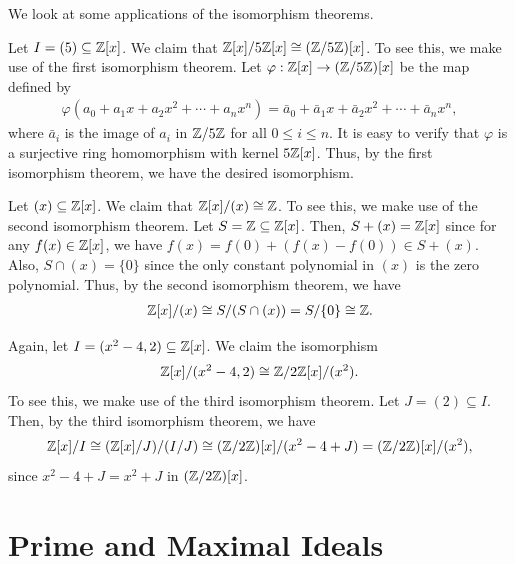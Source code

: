 We look at some applications of the isomorphism theorems.

\begin{example}
    Let $I = (5) \subseteq \mathbb{Z}[x]$. We claim that $\mathbb{Z}[x]/5\mathbb{Z}[x] \cong (\mathbb{Z}/5\mathbb{Z})[x]$. To see this, we make use of the first isomorphism theorem. Let $\varphi : \mathbb{Z}[x] \to (\mathbb{Z}/5\mathbb{Z})[x]$ be the map defined by
    \begin{align}
        \varphi\left( a_{0} + a_{1}x + a_{2}x^{2} + \cdots + a_{n}x^{n} \right) = \bar{a}_{0} + \bar{a}_{1}x + \bar{a}_{2}x^{2} + \cdots + \bar{a}_{n}x^{n},
    \end{align}
    where $\bar{a}_{i}$ is the image of $a_{i}$ in $\mathbb{Z}/5\mathbb{Z}$ for all $0 \leq i \leq n$. It is easy to verify that $\varphi$ is a surjective ring homomorphism with kernel $5\mathbb{Z}[x]$. Thus, by the first isomorphism theorem, we have the desired isomorphism.
\end{example}

\begin{example}
    Let $(x) \subseteq \mathbb{Z}[x]$. We claim that $\mathbb{Z}[x]/(x) \cong \mathbb{Z}$. To see this, we make use of the second isomorphism theorem. Let $S = \mathbb{Z} \subseteq \mathbb{Z}[x]$. Then, $S + (x) = \mathbb{Z}[x]$ since for any $f(x) \in \mathbb{Z}[x]$, we have $f(x) = f(0) + (f(x) - f(0)) \in S + (x)$. Also, $S \cap (x) = \{0\}$ since the only constant polynomial in $(x)$ is the zero polynomial. Thus, by the second isomorphism theorem, we have
    \begin{align}
        \mathbb{Z}[x]/(x) \cong S/(S \cap (x)) = S/\{0\} \cong \mathbb{Z}.
    \end{align}
\end{example}

\begin{example}
    Again, let $I = (x^{2}-4,2) \subseteq \mathbb{Z}[x]$. We claim the isomorphism
    \begin{align}
        \mathbb{Z}[x]/(x^{2}-4,2) \cong \mathbb{Z}/2\mathbb{Z}[x]/(x^{2}).
    \end{align}
    To see this, we make use of the third isomorphism theorem. Let $J = (2) \subseteq I$. Then, by the third isomorphism theorem, we have
    \begin{align}
        \mathbb{Z}[x]/I \cong (\mathbb{Z}[x]/J)/(I/J) \cong (\mathbb{Z}/2\mathbb{Z})[x]/(x^{2}-4 + J) = (\mathbb{Z}/2\mathbb{Z})[x]/(x^{2}),
    \end{align}
    since $x^{2}-4 + J = x^{2} + J$ in $(\mathbb{Z}/2\mathbb{Z})[x]$.
\end{example}


\section{Prime and Maximal Ideals}

